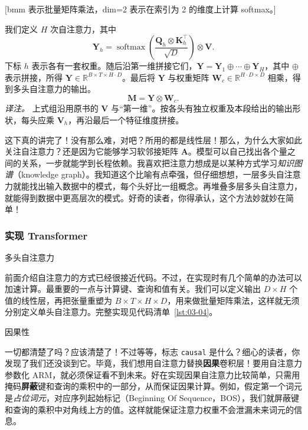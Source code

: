 [bmm 表示批量矩阵乘法，dim=2 表示在索引为 2 的维度上计算 softmax。]

我们定义 $H$ 次自注意力，其中
\[
\mathbf{Y}_h=\operatorname{softmax}\left(\frac{\mathbf{Q}_h\otimes\mathbf{K}_h^\top}{\sqrt{D}}\right)\otimes\mathbf{V}.
\]
下标 $h$ 表示各有一套权重。随后沿第一维拼接它们，$\mathbf{Y}=\mathbf{Y}_1\oplus\cdots\oplus\mathbf{Y}_H$，其中 $\oplus$ 表示拼接，所得 $\mathbf{Y}\in\mathbb{R}^{B\times T\times H\cdot D}$。最后将 $\mathbf{Y}$ 与权重矩阵 $\mathbf{W}_c\in\mathbb{R}^{H\cdot D\times D}$ 相乘，得到多头自注意力的输出。
\[
\mathbf{M}=\mathbf{Y}\otimes\mathbf{W}_c.
\]
\emph{译注。} 上式组沿用原书的 $\mathbf{V}$ 与“第一维”。按各头有独立权重及本段给出的输出形状，每头应乘 $\mathbf{V}_h$，再沿最后一个特征维度拼接。

这下真的讲完了！没有那么难，对吧？所用的都是线性层！那么，为什么大家如此关注自注意力？还是因为它能够学习软邻接矩阵 $\mathbf{A}$。模型可以自己找出各个量之间的关系，一步就能学到长程依赖。我喜欢把注意力想成是以某种方式学习\emph{知识图谱}（knowledge graph）。我知道这个比喻有点牵强，但仔细想想，一层多头自注意力就能找出输入数据中的模式，每个头好比一组概念。再堆叠多层多头自注意力，就能得到数据中更高层次的模式。好奇的读者，你得承认，这个方法妙就妙在简单！

\subsubsection{实现 Transformer}
\par\medskip\noindent 多头自注意力\par\nobreak\smallskip

前面介绍自注意力的方式已经很接近代码。不过，在实现时有几个简单的办法可以加速计算。最重要的一点与计算键、查询和值有关。我们可以定义输出 $D\times H$ 个值的线性层，再把张量重塑为 $B\times T\times H\times D$，用来做批量矩阵乘法，这样就无须分别定义单头自注意力。完整实现见代码清单~\ref{lst:03-04}。



\par\medskip\noindent 因果性\par\nobreak\smallskip
一切都清楚了吗？应该清楚了！不过等等，标志 \texttt{causal} 是什么？细心的读者，你发现了我们还没谈到它。毕竟，我们想用自注意力替换\textbf{因果}卷积层！要用自注意力参数化 ARM，就必须保证看不到未来。好在实现因果自注意力比较简单，只需用掩码\textbf{屏蔽}键和查询的乘积中的一部分，从而保证因果计算。例如，假定第一个词元是\emph{占位词元}，对应序列起始标记（Beginning Of Sequence，BOS），我们就屏蔽键和查询的乘积中对角线上方的值。这样就能保证注意力权重不会泄漏未来词元的信息。

